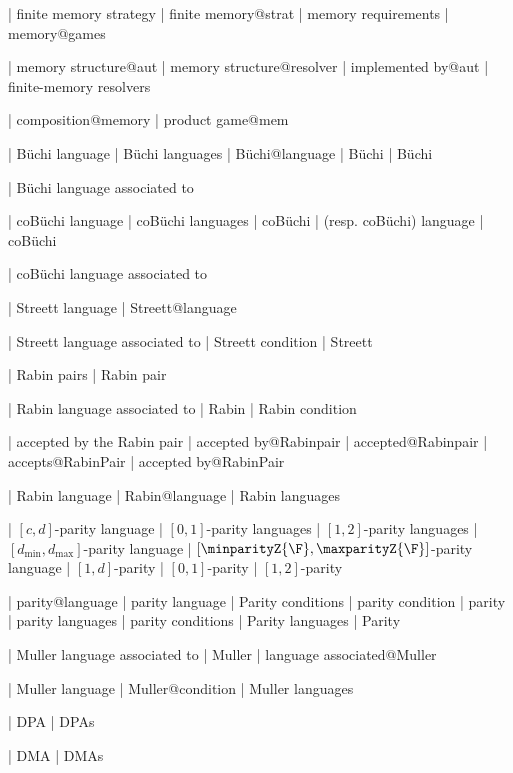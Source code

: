   | finite memory strategy
  | finite memory@strat
  | memory requirements
  | memory@games

| memory structure@aut
| memory structure@resolver
| implemented by@aut
| finite-memory resolvers


  | composition@memory
  | product game@mem


  | B\"uchi language
  | Büchi languages
  | B\"uchi@language
  | B\"uchi
  | Büchi
   
  
 | Büchi language associated to
 
  | coB\"uchi language
  | coB\"uchi languages
  | coB\"uchi
  | (resp. coB\"uchi) language
  | coBüchi

  | coB\"uchi language associated to
  
  | Streett language
  | Streett@language
  
| Streett language associated to
| Streett condition
| Streett

  | Rabin pairs
  | Rabin pair

  | Rabin language associated to
  | Rabin
  | Rabin condition

  | accepted by the Rabin pair
  | accepted by@Rabinpair
  | accepted@Rabinpair
  | accepts@RabinPair
  | accepted by@RabinPair
  

  | Rabin language
  | Rabin@language
  | Rabin languages

  | $[c,d]$-parity language
  | $[0,1]$-parity languages
  | $[1,2]$-parity languages
  | $[d_{\min }, d_{\max }]$-parity language
  | $[\minparityZ {\F },\maxparityZ {\F }]$-parity language
  | $[1,d]$-parity
  | $[0,1]$-parity
  | $[1,2]$-parity
  
  | parity@language
  | parity language
  | Parity conditions
  | parity condition
  | parity
  | parity languages
  | parity conditions
  | Parity languages
  | Parity
  

  | Muller language associated to
  | Muller
  | language associated@Muller
  

  | Muller language
  | Muller@condition
  | Muller languages
  
  | DPA
  | DPAs
  
    | DMA
    | DMAs
  

